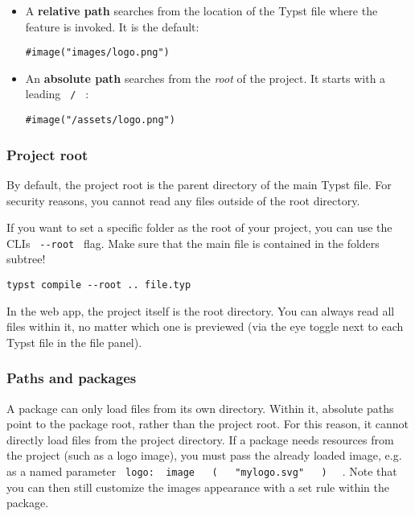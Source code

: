 \begin{itemize}
\item
  A \textbf{relative path} searches from the location of the Typst file
  where the feature is invoked. It is the default:

\begin{verbatim}
#image("images/logo.png")
\end{verbatim}
\item
  An \textbf{absolute path} searches from the \emph{root} of the
  project. It starts with a leading \texttt{\ /\ } :

\begin{verbatim}
#image("/assets/logo.png")
\end{verbatim}
\end{itemize}

\subsubsection{Project root}\label{project-root}

By default, the project root is the parent directory of the main Typst
file. For security reasons, you cannot read any files outside of the
root directory.

If you want to set a specific folder as the root of your project, you
can use the CLI\textquotesingle s \texttt{\ -\/-root\ } flag. Make sure
that the main file is contained in the folder\textquotesingle s subtree!

\begin{verbatim}
typst compile --root .. file.typ
\end{verbatim}

In the web app, the project itself is the root directory. You can always
read all files within it, no matter which one is previewed (via the eye
toggle next to each Typst file in the file panel).

\subsubsection{Paths and packages}\label{paths-and-packages}

A package can only load files from its own directory. Within it,
absolute paths point to the package root, rather than the project root.
For this reason, it cannot directly load files from the project
directory. If a package needs resources from the project (such as a logo
image), you must pass the already loaded image, e.g. as a named
parameter
\texttt{\ logo:\ }{\texttt{\ image\ }}\texttt{\ }{\texttt{\ (\ }}\texttt{\ }{\texttt{\ "mylogo.svg"\ }}\texttt{\ }{\texttt{\ )\ }}\texttt{\ }
. Note that you can then still customize the image\textquotesingle s
appearance with a set rule within the package.

